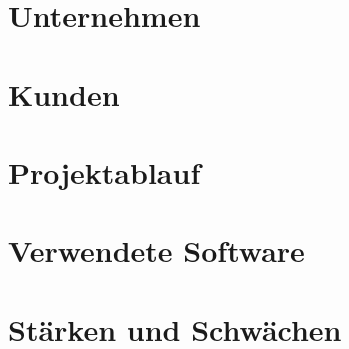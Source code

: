 \section{Unternehmen}


\section{Kunden}


\section{Projektablauf}\label{chap:projektablauf}


\section{Verwendete Software}\label{chap:verwendete_software}


\section{Stärken und Schwächen}


% 
